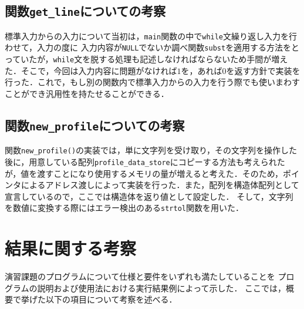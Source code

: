 \documentclass[a4j,11pt]{jarticle}
\begin{document}
\subsection{関数\texttt{get\_line}についての考察}
標準入力からの入力について当初は，\verb|main|関数の中で\verb|while|文繰り返し入力を行わせて，入力の度に
入力内容が\verb|NULL|でないか調べ関数\verb|subst|を適用する方法をとっていたが，\verb|while|文を脱する処理も記述しなければならないため手間が増えた．そこで，今回は入力内容に問題がなければ$1$を，あれば$0$を返す方針で実装を行った．これで，もし別の関数内で標準入力からの入力を行う際でも使いまわすことができ汎用性を持たせることができる．

\subsection{関数\texttt{new\_profile}についての考察}
関数\verb|new_profile()|の実装では，単に文字列を受け取り，その文字列を操作した後に，用意している配列\verb|profile_data_store|にコピーする方法も考えられたが，値を渡すことになり使用するメモリの量が増えると考えた．そのため，ポインタによるアドレス渡しによって実装を行った．また，配列を構造体配列として宣言しているので，ここでは構造体を返り値として設定した．
そして，文字列を数値に変換する際にはエラー検出のある\verb|strtol|関数を用いた．

\section{結果に関する考察}


演習課題のプログラムについて仕様と要件をいずれも満たしていることを
プログラムの説明および使用法における実行結果例によって示した．
ここでは，概要で挙げた以下の項目について考察を述べる．
\end{document}
